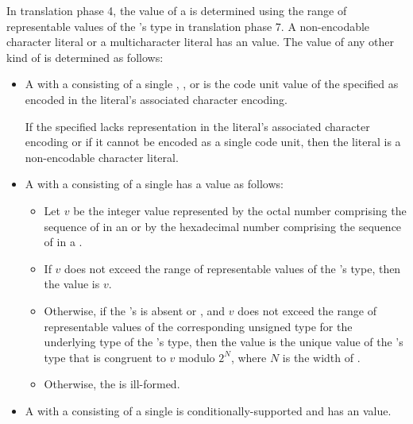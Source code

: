\documentclass{wg21}
\begin{document}
\pnum
In translation phase 4,
the value of a  is determined
using the range of representable values
of the 's type in translation phase 7.
A non-encodable character literal or a multicharacter literal
has an
value.
The value of any other kind of 
is determined as follows:
\begin{itemize}
    \item
    A  with
    a  consisting of a single
    ,
    , or
    is the code unit value of the specified 
    as encoded in the literal's associated character encoding.
    \begin{note}
        If the specified  lacks
        representation in the literal's associated character encoding or
        if it cannot be encoded as a single code unit,
        then the literal is a non-encodable character literal.
    \end{note}
    \item
    A  with
    a  consisting of
    a single 
    has a value as follows:
    \begin{itemize}
        \item
        Let $v$ be the integer value represented by
        the octal number comprising
        the sequence of  in
        an  or by
        the hexadecimal number comprising
        the sequence of  in
        a .
        \item
        If $v$ does not exceed
        the range of representable values of the 's type,
        then the value is $v$.
        \item
        Otherwise,
        if the 's 
        is absent or , and
        $v$ does not exceed the range of representable values of the corresponding unsigned type for the underlying type of the 's type,
        then the value is the unique value of the 's type  that is congruent to $v$ modulo $2^N$, where $N$ is the width of .
        \item
        Otherwise, the  is ill-formed.
    \end{itemize}
    \item
    A  with
    a  consisting of
    a single 
    is conditionally-supported and
    has an  value.
\end{itemize}
\end{document}
